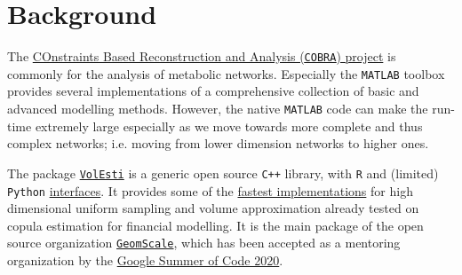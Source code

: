 \documentclass[a4paper, 12pt]{article}
\def\volesti{{\tt volesti}}
\begin{document}





\section{Background}

The \textcolor{blue}{\href{https://opencobra.github.io/}{COnstraints Based Reconstruction and Analysis (\texttt{COBRA}) project}} is commonly for the analysis of metabolic networks. Especially the {\tt MATLAB} toolbox provides several implementations of a comprehensive collection of basic and advanced modelling methods. However, the native {\tt MATLAB} code can make the run-time extremely large especially as we move towards more complete and thus complex networks; i.e. moving from lower dimension networks to higher ones.

The package \textcolor{blue}{\href{https://github.com/GeomScale/volume_approximation}{\texttt{VolEsti}}} is a generic open source \texttt{C++} library, with \texttt{R} and (limited) \texttt{Python} \textcolor{blue}{\href{https://CRAN.R-project.org/package=volesti}{interfaces}}. 
It provides some of the \textcolor{blue}{\href{https://github.com/GeomScale/volume_approximation/wiki}{fastest implementations}} for high dimensional uniform sampling and volume approximation already tested on copula estimation for financial modelling. It is the main package of the open source organization \textcolor{blue}{\href{https://geomscale.github.io/}{{\tt GeomScale}}}, which has been accepted as a mentoring organization by the \textcolor{blue}{\href{https://summerofcode.withgoogle.com/organizations/5673184117915648/}{Google Summer of Code 2020}}.
\end{document}

